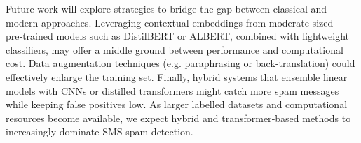 \documentclass[conference]{IEEEtran}
\begin{document}
Future work will explore strategies to bridge the gap between classical and modern approaches.  Leveraging contextual embeddings from moderate‑sized pre‑trained models such as DistilBERT\cite{sanh2019} or ALBERT, combined with lightweight classifiers, may offer a middle ground between performance and computational cost.  Data augmentation techniques (e.g. paraphrasing or back‑translation) could effectively enlarge the training set.  Finally, hybrid systems that ensemble linear models with CNNs or distilled transformers might catch more spam messages while keeping false positives low.  As larger labelled datasets and computational resources become available, we expect hybrid and transformer‑based methods to increasingly dominate SMS spam detection.



\end{document}
